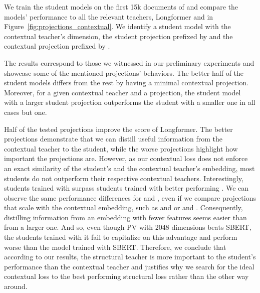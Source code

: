 We train the student models on the first 15k documents of 
and compare the models' performance to all the relevant teachers, Longformer
and  in Figure~\ref{fig:projections_contextual}.
We identify a student model with the contextual teacher's dimension, the
student projection prefixed by  and the contextual projection
prefixed by .

The results correspond to those we witnessed in our preliminary experiments and
showcase some of the mentioned projections' behaviors. The better half of the
student models differs from the rest by having a minimal contextual projection.
Moreover, for a given contextual teacher and a projection, the student model
with a larger student projection outperforms the student with a smaller one in
all cases but one.

Half of the tested projections improve the score of Longformer. The better projections demonstrate
that we can distill useful information from the contextual teacher to
the student, while the worse projections highlight how important the projections are. However,
as our contextual loss does not enforce an exact similarity of the student's and
the contextual teacher's embedding, most students do not outperform
their respective contextual teachers. Interestingly, students trained with
 surpass students trained with better performing
. We can observe the same performance differences for
 and , even if we compare projections that
scale with the contextual embedding, such as  and
 or  and
. Consequently, distilling
information from an embedding with fewer features seems easier than from a larger one. And
so, even though PV with 2048 dimensions beats SBERT, the students trained with
it fail to capitalize on this advantage and perform worse than the model
trained with SBERT. Therefore, we conclude that according to our results, the
structural teacher is more important to the student's performance than the
contextual teacher and justifies why we search for the ideal contextual loss to
the best performing structural loss rather than the other way around.

